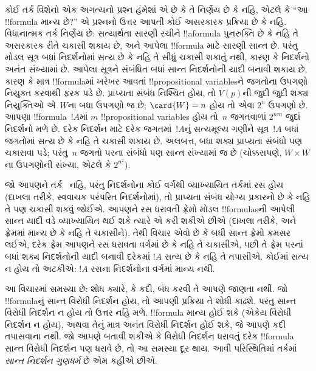 \documentclass[../../../include/open-logic-section]{subfiles}
\begin{document}


કોઈ તર્ક વિશેનો એક અગત્યનો પ્રશ્ન હંમેશાં એ છે કે તે નિર્ણેય છે કે
નહિ, એટલે કે ``આ !!{formula} માન્ય છે?'' એ પ્રશ્નનો ઉત્તર આપતી
કોઈ અસરકારક પ્રક્રિયા છે કે નહિ. વિધાનાત્મક તર્ક નિર્ણેય છે:
સત્યાર્થતા સારણી રચીને !!a{formula} પુનરુક્તિ છે કે નહિ તે
અસરકારક રીતે ચકાસી શકાય છે, અને આપેલા !!{formula} માટે સારણી
સાન્ત છે. પરંતુ મોડલ સૂત્ર બધાં નિદર્શનોમાં સત્ય છે કે નહિ તે સીધું
ચકાસી શકાતું નથી, કારણ કે નિદર્શનો અનંત સંખ્યામાં છે. આપેલા સૂત્રને
સંબંધિત બધાં સાન્ત નિદર્શનોની યાદી બનાવી શકાય છે, કારણ કે માત્ર
!!{formula}માં ખરેખર આવતાં !!{propositional variable}sને જગતોના
ઉપગણો નિયુક્ત કરવાથી ફરક પડે છે. પ્રાપ્યતા સંબંધ નિશ્ચિત હોય, તો
$V(p)$ની જુદી જુદી શક્ય નિયુક્તિઓ એ~$W$ના બધા ઉપગણો જ છે;
$\card{W} = n$ હોય તો એવા $2^n$ ઉપગણો છે. આપણા
!!{formula}~$!A$માં $m$ !!{propositional
  variable}s હોય તો~$n$ જગતવાળાં $2^{nm}$ જુદાં નિદર્શનો મળે છે.
દરેક નિદર્શન માટે દરેક જગતમાં~$!A$નું સત્યમૂલ્ય ગણીને સૂત્ર~$!A$
બધાં જગતોમાં સત્ય છે કે નહિ તે ચકાસી શકાય છે. અલબત્ત, બધા શક્ય
પ્રાપ્યતા સંબંધો પણ ચકાસવા પડે; પરંતુ~$n$ જગતો પરના સંબંધો પણ
સાન્ત સંખ્યામાં જ છે (ચોક્કસપણે, $W \times W$ના ઉપગણોની સંખ્યા,
એટલે કે $2^{n^2}$).

જો આપણને તર્ક~ નહિ, પરંતુ નિદર્શનોના કોઈ વર્ગથી
વ્યાખ્યાયિત તર્કમાં રસ હોય (દાખલા તરીકે, સ્વવાચક પરંપરિત
નિદર્શનોમાં), તો પ્રાપ્યતા સંબંધ યોગ્ય પ્રકારનો છે કે નહિ તે પણ
ચકાસી શકવું જોઈએ. આપણને રસ ધરાવતી ફ્રેમો મોડલ !!{formula}sની
આપેલી સાન્ત યાદી વડે વ્યાખ્યાયિત થઈ શકે ત્યારે એ કરી શકીએ છીએ (દાખલા તરીકે,
 અને  ફ્રેમમાં માન્ય છે કે નહિ તે ચકાસીને). તેથી વિચાર
એવો છે કે બધી સાન્ત ફ્રેમો ક્રમસર લઈએ, દરેક ફ્રેમ આપણને રસ ધરાવતા
વર્ગમાં છે કે નહિ તે ચકાસીએ, પછી તે ફ્રેમ પરનાં બધાં શક્ય
નિદર્શનોની યાદી બનાવી દરેકમાં $!A$ સત્ય છે કે નહિ તે તપાસીએ.
કોઈમાં સત્ય ન હોય તો અટકીએ: $!A$ રસના નિદર્શનોના વર્ગમાં માન્ય
નથી.

આ વિચારમાં સમસ્યા છે: શોધ ક્યારે, કે કદી, બંધ કરવી તે આપણે જાણતા
નથી. જો !!{formula}નું સાન્ત વિરોધી નિદર્શન હોય, તો આપણી પ્રક્રિયા
તે શોધી કાઢશે. પરંતુ સાન્ત વિરોધી નિદર્શન ન હોય તો ઉત્તર નહિ મળે.
!!{formula} માન્ય હોઈ શકે (એકેય વિરોધી નિદર્શન ન હોય), અથવા તેનું
માત્ર અનંત વિરોધી નિદર્શન હોઈ શકે, જે આપણે કદી તપાસવાના નથી.
જો આપણે બતાવી શકીએ કે વિરોધી નિદર્શન ધરાવતું દરેક !!{formula}
સાન્ત વિરોધી નિદર્શન પણ ધરાવે છે, તો આ સમસ્યા દૂર થાય. આવી
પરિસ્થિતિમાં તર્કમાં \emph{સાન્ત નિદર્શન ગુણધર્મ} છે એમ કહીએ છીએ.
\end{document}
